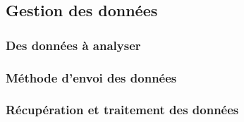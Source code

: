 \subsection{Gestion des données}

\subsubsection{Des données à analyser}

\subsubsection{Méthode d'envoi des données}

\subsubsection{Récupération et traitement des données}